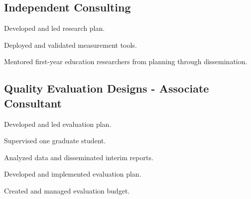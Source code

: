 
\subsection{Independent Consulting}
\begin{cvtable}
        {\color{cvsectioncolor}{Entrepreneurial Mindset and Cultural Wealth in Engineering}}
        {}
        {\begin{tightitemize}
            \item Developed and led research plan.
            \item Deployed and validated measurement tools.
            \item Mentored first-year education researchers from planning through dissemination.
        \end{tightitemize}}
\end{cvtable}

\subsection{Quality Evaluation Designs - Associate Consultant}
\begin{cvtable}
        {\color{cvsectioncolor}{Advocacy Building Campaign for Engineering Education Research}}
        {}
        {\begin{tightitemize}
            \item Developed and led evaluation plan.
            \item Supervised one graduate student.
            \item Analyzed data and disseminated interim reports.
        \end{tightitemize}}
        {\color{cvsectioncolor}{Peer Review as an Inclusive Mentoring Experience}}
        {}
        {\begin{tightitemize}
            \item Developed and implemented evaluation plan.
            \item Created and managed evaluation budget.
        \end{tightitemize}}
\end{cvtable}

